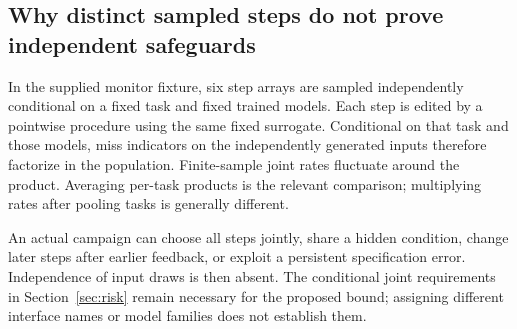 \subsection{Why distinct sampled steps do not prove independent safeguards}
In the supplied monitor fixture, six step arrays are sampled independently conditional on a fixed task and fixed trained models. Each step is edited by a pointwise procedure using the same fixed surrogate. Conditional on that task and those models, miss indicators on the independently generated inputs therefore factorize in the population. Finite-sample joint rates fluctuate around the product. Averaging per-task products is the relevant comparison; multiplying rates after pooling tasks is generally different.

An actual campaign can choose all steps jointly, share a hidden condition, change later steps after earlier feedback, or exploit a persistent specification error. Independence of input draws is then absent. The conditional joint requirements in Section~\ref{sec:risk} remain necessary for the proposed bound; assigning different interface names or model families does not establish them.
